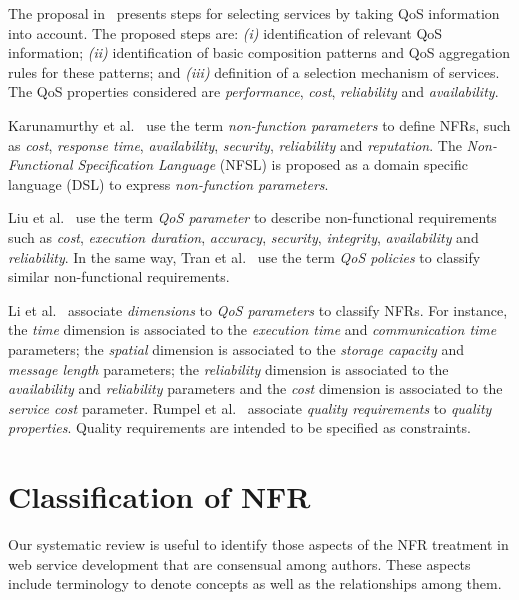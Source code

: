 \documentclass[english,12pt]{article}
\begin{document}
The proposal in~\cite{ThissenW06} presents steps for  selecting services 
by taking QoS information into account. The proposed steps are: 
\textit{(i)} identification of relevant QoS information; 
\textit{(ii)} identification of basic composition patterns and 
QoS aggregation rules for these patterns; and 
\textit{(iii)} definition of a selection mechanism of services. 
The QoS properties considered are \textit{performance}, \textit{cost}, \textit{reliability} and
\textit{availability}. 
  
Karunamurthy et al.~\cite{Karunamurthy2012787} use the term \textit{non-function parameters} to define NFRs, such as \textit{cost}, \textit{response time}, \textit{availability}, \textit{security}, \textit{reliability} and \textit{reputation}.  
The \textit{Non-Func\-tion\-al Specification Language} (NFSL) is proposed as a domain specific language (DSL) to express \textit{non-function parameters}.

Liu et al.~\cite{Liu20121080} use the term \textit{QoS parameter} to describe non-functional requirements such as \textit{cost}, \textit{execution duration}, \textit{accuracy}, \textit{security}, \textit{integrity}, \textit{availability} and \textit{reliability}.  
In the same way, Tran et al.~\cite{Tran2012531} use the term \textit{QoS policies} to classify similar non-functional requirements.

Li et al.~\cite{Li2013} associate \textit{dimensions} to  \textit{QoS parameters} to classify NFRs.  
For instance, the \textit{time} dimension is associated to the \textit{execution time} and \textit{communication time} parameters; the \textit{spatial} dimension is associated to the \textit{storage capacity} and \textit{message length} parameters; the \textit{reliability} dimension is associated to the \textit{availability} and \textit{reliability} parameters and the \textit{cost} dimension is associated to the \textit{service cost} parameter.
Rumpel et al.~\cite{Rumpel2012}  associate \textit{quality requirements} to  \textit{quality properties}. Quality requirements are intended to be specified as constraints. 


\section{Classification of NFR}
\label{sec:classification}

Our systematic review is useful to identify those aspects of the NFR treatment in web service development that are consensual among authors.
These aspects include terminology to denote concepts as well as the relationships among them.
\end{document}
